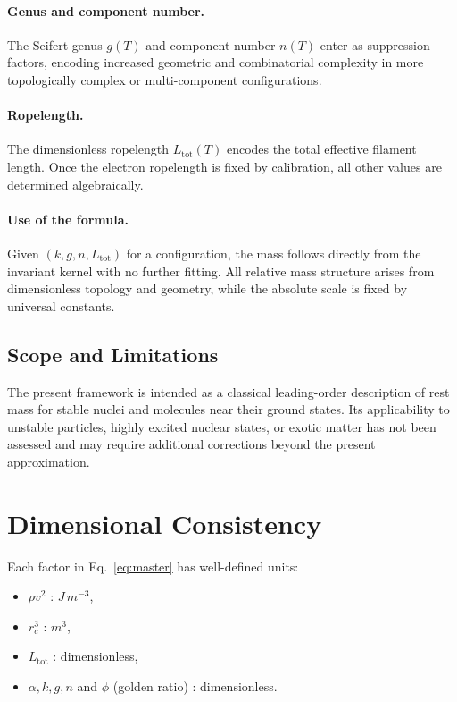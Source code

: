 \documentclass[11pt,a4paper]{article}
\begin{document}
            \paragraph{Genus and component number.}
                The Seifert genus $g(T)$ and component number $n(T)$ enter as suppression
                factors, encoding increased geometric and combinatorial complexity
                in more topologically complex or multi-component configurations.

            \paragraph{Ropelength.}
                The dimensionless ropelength $L_{\mathrm{tot}}(T)$ encodes the total
                effective filament length.
                Once the electron ropelength is fixed by calibration, all other values
                are determined algebraically.

            \paragraph{Use of the formula.}
                Given $(k,g,n,L_{\mathrm{tot}})$ for a configuration, the mass follows
                directly from the invariant kernel with no further fitting.
                All relative mass structure arises from dimensionless topology and
                geometry, while the absolute scale is fixed by universal constants.

        \subsection{Scope and Limitations}

            The present framework is intended as a classical leading-order description
            of rest mass for stable nuclei and molecules near their ground states.
            Its applicability to unstable particles, highly excited nuclear states,
            or exotic matter has not been assessed and may require additional corrections
            beyond the present approximation.

    \section{Dimensional Consistency}

        Each factor in Eq.~\eqref{eq:master} has well-defined units:
        \begin{itemize}
            \item $\rho v^2$ : $\si{J\,m^{-3}}$,
            \item $r_c^3$ : $\si{m^3}$,
            \item $L_{\text{tot}}$ : dimensionless,
            \item $\alpha, k, g, n$ and $\phi$ (golden ratio) : dimensionless.
        \end{itemize}
\end{document}
